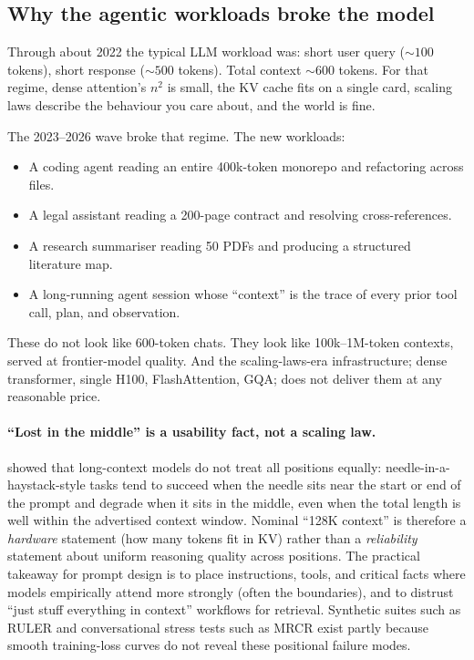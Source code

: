 \subsection{Why the agentic workloads broke the model}

Through about 2022 the typical LLM workload was: short user query
(${\sim}100$ tokens), short response (${\sim}500$ tokens). Total context
${\sim}600$ tokens. For that regime, dense attention's \(n^2\) is small,
the KV cache fits on a single card, scaling laws describe the behaviour you
care about, and the world is fine.

The 2023--2026 wave broke that regime. The new workloads:

\begin{itemize}
\item A coding agent reading an entire 400k-token monorepo and refactoring
across files.
\item A legal assistant reading a 200-page contract and resolving
cross-references.
\item A research summariser reading 50 PDFs and producing a structured
literature map.
\item A long-running agent session whose ``context'' is the trace of every
prior tool call, plan, and observation.
\end{itemize}

These do not look like 600-token chats. They look like 100k--1M-token
contexts, served at frontier-model quality. And the scaling-laws-era
infrastructure; dense transformer, single H100, FlashAttention,
GQA; does not deliver them at any reasonable price.

\paragraph{``Lost in the middle'' is a usability fact, not a scaling law.}
\citet{liu2024lostmiddle} showed that long-context models do not treat all
positions equally: needle-in-a-haystack-style tasks tend to succeed when
the needle sits near the start or end of the prompt and degrade when it
sits in the middle, even when the total length is well within the
advertised context window. Nominal ``128K context'' is therefore a
\emph{hardware} statement (how many tokens fit in KV) rather than a
\emph{reliability} statement about uniform reasoning quality across
positions. The practical takeaway for prompt design is to place
instructions, tools, and critical facts where models empirically attend
more strongly (often the boundaries), and to distrust ``just stuff
everything in context'' workflows for retrieval. Synthetic suites such as
RULER \citep{hsieh2024ruler} and conversational stress tests such as MRCR
\citep{chen2025mrcr} exist partly because smooth training-loss curves do
not reveal these positional failure modes.


